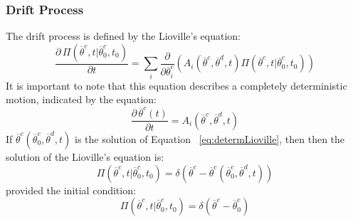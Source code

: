 \subsubsection{Drift Process}
\label{sec:CKDrift}
The drift process is defined by the Lioville’s equation:
\begin{equation}
\label{eq:lioville}
  \frac{\partial \, \Pi \left (\overline{\theta}^{c},t|\overline{\theta}^{c}_{0},t_{0}  \right ) }{\partial t} = \sum_{i}\frac{\partial }{\partial \overline{\theta}^{c}_{i}}\left ( A_{i}\left ( \overline{\theta}^{c},\overline{\theta}^{d},t \right ) \Pi \left (\overline{\theta}^{c},t|\overline{\theta}^{c}_{0},t_{0}  \right ) \right )
\end{equation}
It is important to note that this equation describes a completely deterministic motion, indicated by the equation:
\begin{equation}
\label{eq:determLioville}
   \frac{\partial \, \overline{\theta}^{c}\left ( t \right ) }{\partial t} = A_{i}\left ( \overline{\theta}^{c},\overline{\theta}^{d},t \right )
\end{equation}
If $\overline{\theta}^{c} \left (\overline{\theta}^{c}_{0},\overline{\theta}^{d},t  \right )$ is the solution of Equation ~\ref{eq:determLioville}, then then the solution of the Lioville's equation is:
\begin{equation}
\label{eq:solLioville}
\Pi \left (\overline{\theta}^{c},t|\overline{\theta}^{c}_{0},t_{0}  \right ) = \delta\left ( \overline{\theta}^{c} - \overline{\theta}^{c}\left ( \overline{\theta}^{c}_{0},\overline{\theta}^{d},t \right ) \right )
\end{equation}
provided the initial condition:
\begin{equation}
\label{eq:solLiovilleInitCond}
\Pi \left (\overline{\theta}^{c},t|\overline{\theta}^{c}_{0},t_{0}  \right ) = \delta\left ( \overline{\theta}^{c} - \overline{\theta}^{c}_{0} \right )
\end{equation}
%
%
%
%
